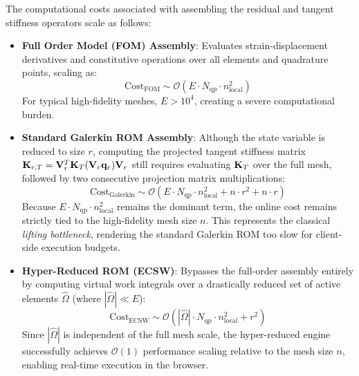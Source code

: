 The computational costs associated with assembling the residual and tangent stiffness operators scale as follows:
\begin{itemize}
        \item \textbf{Full Order Model (FOM) Assembly}: Evaluates strain-displacement derivatives and constitutive operations over all elements and quadrature points, scaling as:
        \begin{equation}
                \text{Cost}_{\text{FOM}} \sim \mathcal{O}\left( E \cdot N_{\text{qp}} \cdot n_{\text{local}}^2 \right)
        \end{equation}
        For typical high-fidelity meshes, $E > 10^4$, creating a severe computational burden.
        
        \item \textbf{Standard Galerkin ROM Assembly}: Although the state variable is reduced to size $r$, computing the projected tangent stiffness matrix $\mathbf{K}_{r,T} = \mathbf{V}_r^T \mathbf{K}_T(\mathbf{V}_r \mathbf{q}_r) \mathbf{V}_r$ still requires evaluating $\mathbf{K}_T$ over the full mesh, followed by two consecutive projection matrix multiplications:
        \begin{equation}
                \text{Cost}_{\text{Galerkin}} \sim \mathcal{O}\left( E \cdot N_{\text{qp}} \cdot n_{\text{local}}^2 + n \cdot r^2 + n \cdot r \right)
        \end{equation}
        Because $E \cdot N_{\text{qp}} \cdot n_{\text{local}}^2$ remains the dominant term, the online cost remains strictly tied to the high-fidelity mesh size $n$. This represents the classical \textit{lifting bottleneck}, rendering the standard Galerkin ROM too slow for client-side execution budgets.
        
        \item \textbf{Hyper-Reduced ROM (ECSW)}: Bypasses the full-order assembly entirely by computing virtual work integrals over a drastically reduced set of active elements $\widehat{\Omega}$ (where $|\widehat{\Omega}| \ll E$):
        \begin{equation}
                \text{Cost}_{\text{ECSW}} \sim \mathcal{O}\left( |\widehat{\Omega}| \cdot N_{\text{qp}} \cdot n_{\text{local}}^2 + r^2 \right)
        \end{equation}
        Since $|\widehat{\Omega}|$ is independent of the full mesh scale, the hyper-reduced engine successfully achieves $\mathcal{O}(1)$ performance scaling relative to the mesh size $n$, enabling real-time execution in the browser.
\end{itemize}

